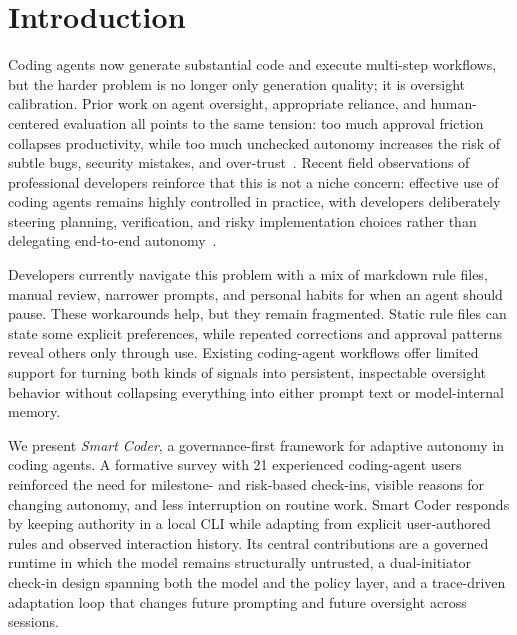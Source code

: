 \section{Introduction}

Coding agents now generate substantial code and execute multi-step workflows, but the harder problem is no longer only generation quality; it is oversight calibration. Prior work on agent oversight, appropriate reliance, and human-centered evaluation all points to the same tension: too much approval friction collapses productivity, while too much unchecked autonomy increases the risk of subtle bugs, security mistakes, and over-trust~\cite{grunde2026overseeing,bansal2021appropriate,wang2025humansmissing}. Recent field observations of professional developers reinforce that this is not a niche concern: effective use of coding agents remains highly controlled in practice, with developers deliberately steering planning, verification, and risky implementation choices rather than delegating end-to-end autonomy~\cite{huang2025dontvibe}.

Developers currently navigate this problem with a mix of markdown rule files, manual review, narrower prompts, and personal habits for when an agent should pause. These workarounds help, but they remain fragmented. Static rule files can state some explicit preferences, while repeated corrections and approval patterns reveal others only through use. Existing coding-agent workflows offer limited support for turning both kinds of signals into persistent, inspectable oversight behavior without collapsing everything into either prompt text or model-internal memory.

We present \emph{Smart Coder}, a governance-first framework for adaptive autonomy in coding agents. A formative survey with 21 experienced coding-agent users reinforced the need for milestone- and risk-based check-ins, visible reasons for changing autonomy, and less interruption on routine work. Smart Coder responds by keeping authority in a local CLI while adapting from explicit user-authored rules and observed interaction history. Its central contributions are a governed runtime in which the model remains structurally untrusted, a dual-initiator check-in design spanning both the model and the policy layer, and a trace-driven adaptation loop that changes future prompting and future oversight across sessions.
